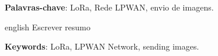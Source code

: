 \documentclass[
article,			%
12pt,				%
oneside,			%
a4paper,			%
english,			%
brazil,				%
sumario=tradicional
]{abntex2}
\begin{document}

\frenchspacing 


%
%

\maketitle



\begin{resumoumacoluna}
  \textbf{Palavras-chave}: LoRa, Rede LPWAN, envio de imagens.
  \vspace{\onelineskip}
  \noindent
\end{resumoumacoluna}

\renewcommand{\resumoname}{Abstract}
\begin{resumoumacoluna}
  \begin{otherlanguage*}{english}
    Escrever resumo
    \vspace{\onelineskip}
    \noindent

    \textbf{Keywords}: LoRa, LPWAN Network, sending images.
  \end{otherlanguage*}  
\end{resumoumacoluna}

\cleardoublepage
\end{document}
